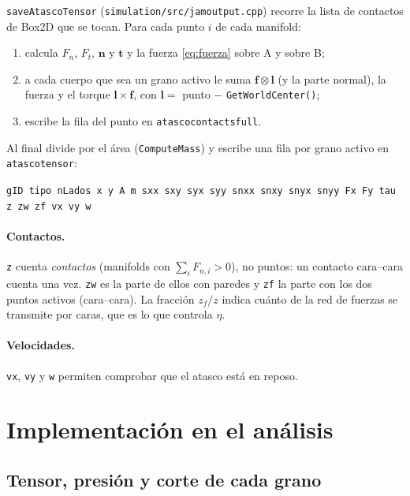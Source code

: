 \documentclass[11pt,a4paper]{article}
\newcommand{\vect}[1]{\mathbf{#1}}
\newcommand{\n}{\vect{n}}
\newcommand{\tv}{\vect{t}}
\newcommand{\lv}{\vect{l}}
\newcommand{\f}{\vect{f}}
\newcommand{\codeus}{\textunderscore\allowbreak}
\newcommand{\code}[1]{\texttt{\begingroup\let\_\codeus#1\endgroup}}
\begin{document}
\code{saveAtascoTensor} (\code{simulation/src/jam\_output.cpp}) recorre
la lista de contactos de Box2D que se tocan. Para cada punto $i$ de cada
manifold:
\begin{enumerate}
  \item calcula $F_n$, $F_t$, $\n$ y $\tv$ y la fuerza
    \eqref{eq:fuerza} sobre A y sobre B;
  \item a cada cuerpo que sea un grano activo le suma $\f\otimes\lv$ (y la
    parte normal), la fuerza y el torque $\lv\times\f$, con
    $\lv = $ punto $-$ \code{GetWorldCenter()};
  \item escribe la fila del punto en \code{atasco\_contacts\_full}.
\end{enumerate}
Al final divide por el área (\code{ComputeMass}) y escribe una fila por
grano activo en \code{atasco\_tensor}:
\begin{center}
  \small\code{gID tipo nLados x y A m sxx sxy syx syy snxx snxy snyx snyy
  Fx Fy tau z z\_w z\_f vx vy w}
\end{center}

\paragraph{Contactos.} \code{z} cuenta \emph{contactos} (manifolds con
$\sum_i F_{n,i} > 0$), no puntos: un contacto cara--cara cuenta una vez.
\code{z\_w} es la parte de ellos con paredes y \code{z\_f} la parte con
los dos puntos activos (cara--cara). La fracción $z_f/z$ indica cuánto de
la red de fuerzas se transmite por caras, que es lo que controla $\eta$.

\paragraph{Velocidades.} \code{vx}, \code{vy} y \code{w} permiten
comprobar que el atasco está en reposo.

\section{Implementación en el análisis}
\label{sec:py}

\subsection{Tensor, presión y corte de cada grano}
\end{document}
